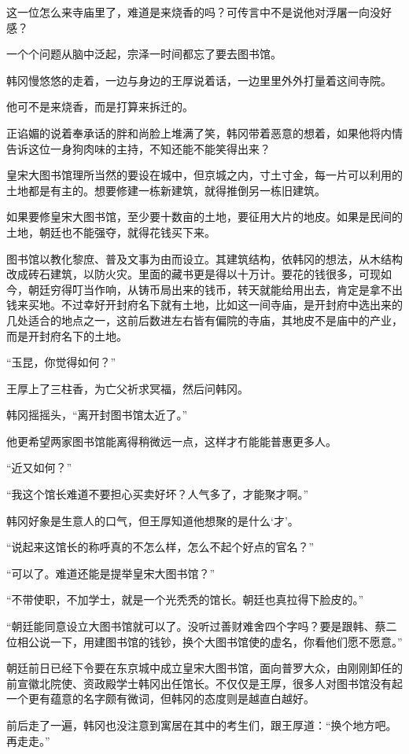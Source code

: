 这一位怎么来寺庙里了，难道是来烧香的吗？可传言中不是说他对浮屠一向没好感？

一个个问题从脑中泛起，宗泽一时间都忘了要去图书馆。

韩冈慢悠悠的走着，一边与身边的王厚说着话，一边里里外外打量着这间寺院。

他可不是来烧香，而是打算来拆迁的。

正谄媚的说着奉承话的胖和尚脸上堆满了笑，韩冈带着恶意的想着，如果他将内情告诉这位一身狗肉味的主持，不知还能不能笑得出来？

皇宋大图书馆理所当然的要设在城中，但京城之内，寸土寸金，每一片可以利用的土地都是有主的。想要修建一栋新建筑，就得推倒另一栋旧建筑。

如果要修皇宋大图书馆，至少要十数亩的土地，要征用大片的地皮。如果是民间的土地，朝廷也不能强夺，就得花钱买下来。

图书馆以教化黎庶、普及文事为由而设立。其建筑结构，依韩冈的想法，从木结构改成砖石建筑，以防火灾。里面的藏书更是得以十万计。要花的钱很多，可现如今，朝廷穷得叮当作响，从铸币局出来的钱币，转天就能给用出去，肯定是拿不出钱来买地。不过幸好开封府名下就有土地，比如这一间寺庙，是开封府中选出来的几处适合的地点之一，这前后数进左右皆有偏院的寺庙，其地皮不是庙中的产业，而是开封府名下的土地。

“玉昆，你觉得如何？”

王厚上了三柱香，为亡父祈求冥福，然后问韩冈。

韩冈摇摇头，“离开封图书馆太近了。”

他更希望两家图书馆能离得稍微远一点，这样才冇能能普惠更多人。

“近又如何？”

“我这个馆长难道不要担心买卖好坏？人气多了，才能聚才啊。”

韩冈好象是生意人的口气，但王厚知道他想聚的是什么‘才’。

“说起来这馆长的称呼真的不怎么样，怎么不起个好点的官名？”

“可以了。难道还能是提举皇宋大图书馆？”

“不带使职，不加学士，就是一个光秃秃的馆长。朝廷也真拉得下脸皮的。”

“朝廷能同意设立大图书馆就可以了。没听过善财难舍四个字吗？要是跟韩、蔡二位相公说一下，用建图书馆的钱钞，换个大图书馆使的虚名，你看他们愿不愿意。”

朝廷前日已经下令要在东京城中成立皇宋大图书馆，面向普罗大众，由刚刚卸任的前宣徽北院使、资政殿学士韩冈出任馆长。不仅仅是王厚，很多人对图书馆没有起一个更有蕴意的名字颇有微词，但韩冈的态度则是越直白越好。

前后走了一遍，韩冈也没注意到寓居在其中的考生们，跟王厚道：“换个地方吧。再走走。”

